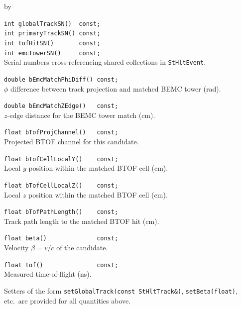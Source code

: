 \documentclass[twoside]{article}
\newcommand{\entrylabel}[1]{\mbox{\textbf{{#1}}}\hfil}%
\newenvironment{entry}
{\begin{list}{}%
    {\renewcommand{\makelabel}{\entrylabel}%
     \setlength{\labelwidth}{90pt}%
     \setlength{\leftmargin}{\labelwidth}
     \advance\leftmargin by \labelsep%
      }%
    }%
  {\end{list}}
\newcommand{\Entrylabel}[1]%
{\raisebox{0pt}[1ex][0pt]{\makebox[\labelwidth][l]%
    {\parbox[t]{\labelwidth}{\hspace{0pt}\textbf{{#1}}}}}}
\newenvironment{Entry}%
{\renewcommand{\entrylabel}{\Entrylabel}\begin{entry}}%
  {\end{entry}}
\begin{document}
\begin{Entry}
    \verb+int globalTrackSN()  const;+\\
    \verb+int primaryTrackSN() const;+\\
    \verb+int tofHitSN()       const;+\\
    \verb+int emcTowerSN()     const;+\\
    Serial numbers cross-referencing shared collections in
    \texttt{StHltEvent}.

    \verb+double bEmcMatchPhiDiff() const;+\\
    $\phi$ difference between track projection and matched BEMC tower (rad).

    \verb+double bEmcMatchZEdge()   const;+\\
    $z$-edge distance for the BEMC tower match (cm).

    \verb+float bTofProjChannel()   const;+\\
    Projected BTOF channel for this candidate.

    \verb+float bTofCellLocalY()    const;+\\
    Local $y$ position within the matched BTOF cell (cm).

    \verb+float bTofCellLocalZ()    const;+\\
    Local $z$ position within the matched BTOF cell (cm).

    \verb+float bTofPathLength()    const;+\\
    Track path length to the matched BTOF hit (cm).

    \verb+float beta()              const;+\\
    Velocity $\beta = v/c$ of the candidate.

    \verb+float tof()               const;+\\
    Measured time-of-flight (ns).

    Setters of the form \verb+setGlobalTrack(const StHltTrack&)+,
    \verb+setBeta(float)+, etc.\ are provided for all quantities above.
\end{Entry}
\clearpage

\end{document}
